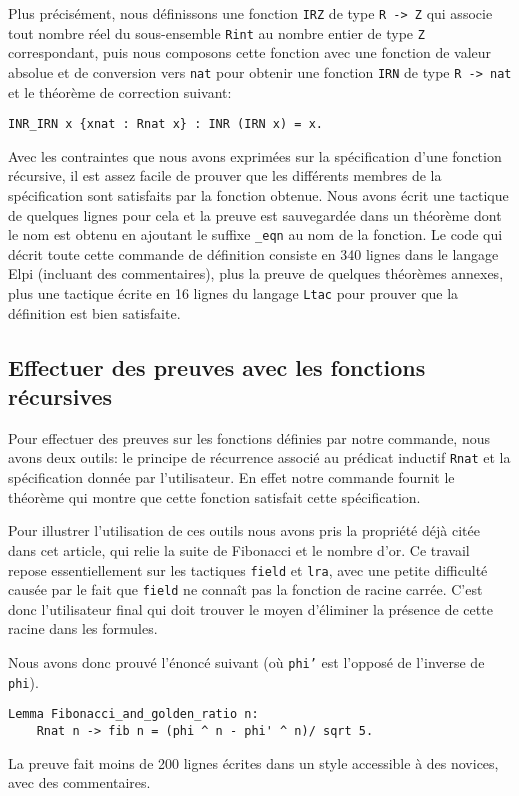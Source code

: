\documentclass{jflart}
\begin{document}
Plus précisément, nous définissons une fonction \texttt{IRZ} de type
\texttt{R -> Z} qui associe tout nombre réel du sous-ensemble \texttt{Rint}
au nombre entier de type \texttt{Z} correspondant, puis nous composons
cette fonction avec une fonction de valeur absolue et de conversion
vers \texttt{nat} pour obtenir une fonction \texttt{IRN} de type \texttt{R ->
  nat} et le théorème de correction suivant:
\begin{verbatim}
INR_IRN x {xnat : Rnat x} : INR (IRN x) = x.
\end{verbatim}

Avec les contraintes que nous avons exprimées sur la spécification
d'une fonction récursive, il est assez facile de prouver que les
différents membres de la spécification sont satisfaits par la fonction
obtenue.  Nous avons écrit une tactique de quelques lignes pour cela
et la preuve est sauvegardée dans un théorème dont le nom est obtenu
en ajoutant le suffixe \texttt{\_eqn} au nom de la fonction.  Le code qui
décrit toute cette commande de définition consiste en 340 lignes dans le
langage Elpi (incluant des commentaires), plus la preuve de quelques
théorèmes annexes, plus une tactique écrite en 16 lignes du langage
\texttt{Ltac} pour prouver que la définition est bien satisfaite.

\subsection{Effectuer des preuves avec les fonctions récursives}
Pour effectuer des preuves sur les fonctions définies par notre
commande, nous avons deux outils: le principe de récurrence associé au
prédicat inductif \texttt{Rnat} et la spécification donnée par
l'utilisateur.  En effet notre commande fournit le théorème qui montre
que cette fonction satisfait cette spécification.

Pour illustrer l'utilisation de ces outils nous avons pris la
propriété déjà citée dans cet article, qui relie la suite de Fibonacci
et le nombre d'or.  Ce travail repose essentiellement sur les
tactiques \texttt{field} et \texttt{lra}, avec une petite difficulté causée
par le fait que \texttt{field} ne connaît pas la fonction de racine
carrée.  C'est donc l'utilisateur final qui doit trouver le moyen
d'éliminer la présence de cette racine dans les formules.

Nous avons donc prouvé l'énoncé suivant (où \texttt{phi'} est l'opposé
de l'inverse de \texttt{phi}).
\begin{verbatim}
Lemma Fibonacci_and_golden_ratio n:
    Rnat n -> fib n = (phi ^ n - phi' ^ n)/ sqrt 5.
\end{verbatim}
La preuve fait moins de 200 lignes écrites dans un style accessible à
des novices, avec des commentaires.
\end{document}
